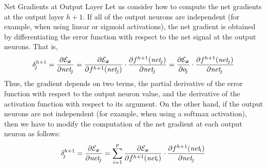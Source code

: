 %
\begin{frame}{Net Gradients at Output Layer}
Let us consider how to compute the net gradients at the output layer
$h+1$. If all of the output neurons are independent (for example, when
using linear or sigmoid activations), the net gradient is
obtained by differentiating the error function with
respect to the net signal at the output neurons. That is,
\begin{align*}
    \delta^{h+1}_{\!j} = \frac{\partial \cE_\bx}{\partial \net_{\!j}} =
    \frac{\partial \cE_\bx}{\partial f^{h+1}(\net_{\!j})} \cdot
\frac{\partial f^{h+1}(\net_{\!j})}{\partial \net_{\!j}} = 
\frac{\partial \cE_\bx}{\partial o_{\!j}} \cdot 
\frac{\partial f^{h+1}(\net_{\!j})}{\partial \net_{\!j}} 
\end{align*}
Thus, the gradient depends on two terms, the partial derivative of the
error function with respect to the output neuron value, and the
derivative of the activation function with respect to its argument.
%
On the other hand, if the output neurons are not independent (for
example, when using a softmax activation), then we have to modify the
computation of the net gradient at each output neuron as follows:
\begin{align*}
    \delta^{h+1}_{\!j} = \frac{\partial {\mathcal E}_{\boldsymbol x}}{\partial \mathit{net}_{\!j}} =
    \sum^{p}_{i=1} \frac{\partial {\mathcal E}_{\boldsymbol x}}{\partial f^{h+1}(\mathit{net}_{\!i})} \cdot
\frac{\partial f^{h+1}(\mathit{net}_{\!i})}{\partial \mathit{net}_{\!j}}
\end{align*}

\end{frame}
